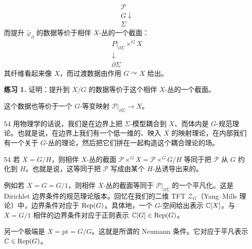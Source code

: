 \begin{equation}\tag{10.64}
\begin{array}{c}
\mathcal{P}\\[2pt]
{\scriptstyle G}\downarrow\\[2pt]
\Sigma
\end{array}
\end{equation}
而提升 $\widetilde{\varphi}_{\partial}$ 的数据等价于相伴 $X$-丛的一个截面：
\begin{equation}\tag{10.65}
\begin{array}{c}
P|_{\partial\Sigma}\times^{G}X\\[2pt]
\downarrow\\[2pt]
\partial\Sigma
\end{array}
\end{equation}
其纤维看起来像 $X$，而过渡数据由作用 $G\curvearrowright X$ 给出。

\textbf{练习 1.} 证明：提升到 $X/G$ 的数据等价于这个相伴 $X$-丛的一个截面。

这个数据也等价于一个 $G$-等变映射 $\mathcal{P}|_{\partial\Sigma}\to X$。

\begin{srcrem}{54}
用物理学的话说，我们是在边界上把 $\Sigma$-模型耦合到 $X$、而体内是 $G$-规范理论。也就是说，在边界上我们有一个低一维的、映入 $X$ 的映射理论，在内部我们有一个关于 $G$-丛的理论，然后把它们拼在一起构造这个耦合理论的场。
\end{srcrem}

\begin{srcex}{54}
若 $X=G/H$，则相伴 $X$-丛的截面 $\mathcal{P}\times^{G}X=\mathcal{P}\times^{G}G/H$ 等同于把 $\mathcal{P}$ 从 $G$ 约化到 $H$。也就是说，这等同于把 $\mathcal{P}$ 写成由某个 $H$-丛诱导出来的。

例如若 $X=G=G/1$，则相伴 $X$-丛的截面等同于 $\mathcal{P}|_{\partial\Sigma}$ 的一个平凡化。这是 Dirichlet 边界条件的规范理论版本。回忆在我们的二维 TFT $\mathcal{Z}_G$（Yang--Mills 理论）中，边界条件对应于 $\mathrm{Rep}(G)$。具体地，一个 $G$-空间给出表示 $\mathbb{C}[X]$。与 $X=G/1$ 相伴的边界条件对应于正则表示 $\mathbb{C}[G]\in\mathrm{Rep}(G)$。

另一个极端是 $X=\mathrm{pt}=G/G$。这就是所谓的 Neumann 条件。它对应于平凡表示 $\mathbb{C}\in\mathrm{Rep}(G)$。
\end{srcex}


